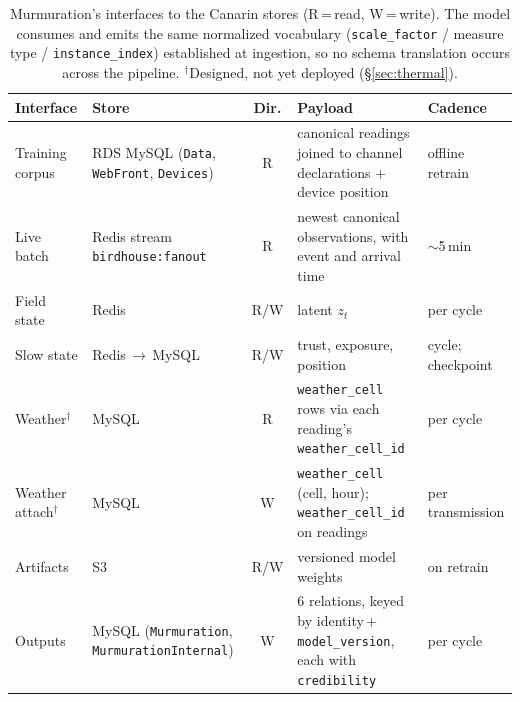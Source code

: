 \documentclass[10pt]{article}
\begin{document}
\begin{table}[t]
\centering
\small
\begin{tabular}{@{}llcp{4.3cm}l@{}}
\toprule
Interface & Store & Dir. & Payload & Cadence \\
\midrule
Training corpus & RDS MySQL (\texttt{Data}, \texttt{WebFront}, \texttt{Devices}) & R & canonical readings joined to channel declarations + device position & offline retrain \\
Live batch & Redis stream \texttt{birdhouse:fanout} & R & newest canonical observations, with event and arrival time & $\sim$5\,min \\
Field state & Redis & R/W & latent $z_t$ & per cycle \\
Slow state & Redis\,$\to$\,MySQL & R/W & trust, exposure, position & cycle; checkpoint \\
Weather$^\dagger$ & MySQL & R & \texttt{weather\_cell} rows via each reading's \texttt{weather\_cell\_id} & per cycle \\
Weather attach$^\dagger$ & MySQL & W & \texttt{weather\_cell} (cell, hour); \texttt{weather\_cell\_id} on readings & per transmission \\
Artifacts & S3 & R/W & versioned model weights & on retrain \\
Outputs & MySQL (\texttt{Murmuration}, \texttt{MurmurationInternal}) & W & 6 relations, keyed by identity\,+\,\texttt{model\_version}, each with \texttt{credibility} & per cycle \\
\bottomrule
\end{tabular}
\caption{Murmuration's interfaces to the Canarin stores (R\,=\,read,
W\,=\,write). The model consumes and emits the same normalized vocabulary
(\texttt{scale\_factor} / measure type / \texttt{instance\_index})
established at ingestion, so no schema translation occurs across the pipeline.
$^\dagger$Designed, not yet deployed (\S\ref{sec:thermal}).}
\label{tab:io}
\end{table}
\end{document}
